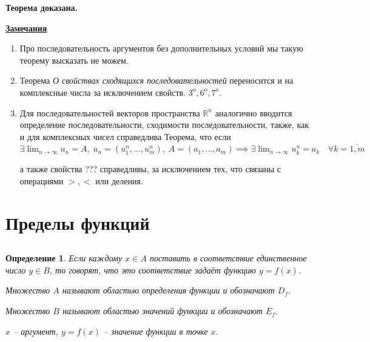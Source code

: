 \documentclass{article}
\newcommand{\parspace}{\vspace{10pt}}
\newcommand{\dslim}{\displaystyle\lim}
\newcommand{\dslimn}{\dslim_{n \to \infty}}
\newcommand{\prop}[1]{#1^{\text{o}}}
\theoremstyle{break}
\newtheorem{definition}{Определение}[subsection]
\begin{document}
\textbf{Теорема доказана.}

\parspace

\underline{\textbf{Замечания}}

\begin{enumerate}
    \item Про последовательность аргументов без дополнительных условий мы такую
    теорему высказать не можем.

    \item Теорема \textit{О свойствах сходящихся последовательностей} переносится
    и на комплексные числа за исключением свойств. $\prop{3}, \prop{6}, \prop{7}$.

    \item Для последовательностей векторов пространства $\mathbb{R}^n$ аналогично
    вводится определение последовательности, сходимости последовательности,
    также, как и для комплексных чисел справедлива Теорема, что если
    $\exists \dslimn u_n = A, \; u_n = (u_1^n, \dots, u_m^n), \;
    A = (a_1, \dots, a_m) \implies \exists \dslimn u_k^n = a_k \quad 
    \forall k = \overline{1, m}$

    а также свойства ??? справедливы, за исключением тех, что связаны
    с операциями $>, <$ или деления.
\end{enumerate}

\section{Пределы функций}

\subsection{}

\begin{definition}
    Если каждому $x \in A$ поставить в соответствие единственное число $y \in B$,
    то говорят, что это соответствие задаёт функцию $y = f(x)$.

    Множество $A$ называют \textit{областью определения функции} и обозначают $D_f$.

    Множество $B$ называют \textit{областью значений функции} и обозначают $E_f$.

    $x$ -- аргумент, $y = f(x)$ -- значение функции в точке $x$.
\end{definition}

\parspace
\end{document}
